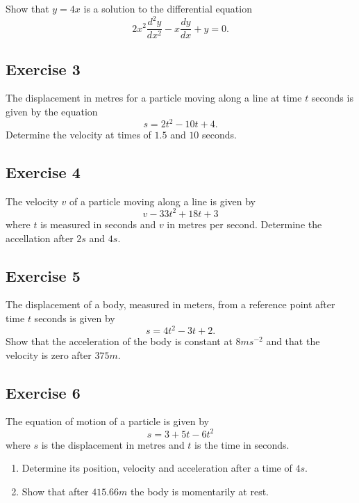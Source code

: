 \documentclass[
  11pt,
  oneside]{book}
\providecommand{\tightlist}{%
  \setlength{\itemsep}{0pt}\setlength{\parskip}{0pt}}
\newcommand{\slide}{}
\theoremstyle{definition}
\theoremstyle{definition}
\theoremstyle{definition}
\theoremstyle{definition}
\theoremstyle{remark}
\begin{document}
Show that \(y=4x\) is a solution to the differential equation
\[
2x^2\frac{d^2y}{dx^2}-x\frac{dy}{dx}+y=0.
\]

\slide

\subsection*{Exercise 3}\label{exercise-3-1}

The displacement in metres for a particle moving along a line at time \(t\) seconds is given by the equation
\[
s=2t^2-10t+4.
\]
Determine the velocity at times of \(1.5\) and \(10\) seconds.

\slide

\subsection*{Exercise 4}\label{exercise-4-1}

The velocity \(v\) of a particle moving along a line is given by
\[
v-33t^2+18t+3
\]
where \(t\) is measured in seconds and \(v\) in metres per second. Determine the accellation after \(2s\) and \(4s\).
\slide

\subsection*{Exercise 5}\label{exercise-5}

The displacement of a body, measured in meters, from a reference point after time \(t\) seconds is given by
\[
s=4t^2-3t+2.
\]
Show that the acceleration of the body is constant at \(8ms^{-2}\) and that the velocity is zero after \(375m\).
\slide

\subsection*{Exercise 6}\label{exercise-6}

The equation of motion of a particle is given by
\[
s=3+5t-6t^2
\]
where \(s\) is the displacement in metres and \(t\) is the time in seconds.

\begin{enumerate}
\def\labelenumi{\alph{enumi}.}
\tightlist
\item
  Determine its position, velocity and acceleration after a time of \(4s\).
\item
  Show that after \(415.66m\) the body is momentarily at rest.
\end{enumerate}
\end{document}
